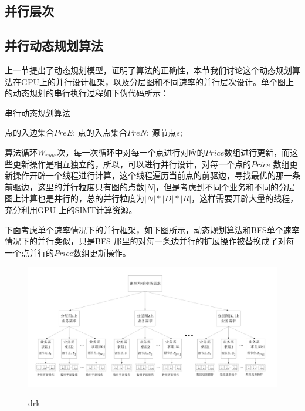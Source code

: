 \subsection{并行层次}
\subsection{并行动态规划算法}

上一节提出了动态规划模型，证明了算法的正确性，本节我们讨论这个动态规划算法在GPU上的并行设计框架，以及分层图和不同速率的并行层次设计。单个图上的动态规划的串行执行过程如下伪代码所示：
\begin{algorithm}[t]
\begin{algorithmic}[1]
\caption{{串行动态规划算法}}
\Require
	 点的入边集合$PreE$;
      点的入点集合$PreN$;
	 源节点$s$;
\EndFor
\EndFor
\end{algorithmic}
\end{algorithm}

算法循环$W_{max}$次，每一次循环中对每一个点进行对应的$Price$数组进行更新，而这些更新操作是相互独立的，所以，可以进行并行设计，对每一个点的$Price$ 数组更新操作开辟一个线程进行计算，这个线程遍历当前点的前驱边，寻找最优的那一条前驱边，这里的并行粒度只有图的点数$|N|$，但是考虑到不同个业务和不同的分层图上计算也是并行的，总的并行粒度为$|N|*|D|*|R|$，这样需要开辟大量的线程，充分利用GPU 上的SIMT计算资源。

下面考虑单个速率情况下的并行框架，如下图所示，动态规划算法和BFS单个速率情况下的并行类似，只是BFS 那里的对每一条边并行的扩展操作被替换成了对每一个点并行的$Price$数组更新操作。
 \begin{figure}
\setlength{\belowcaptionskip}{-0.5cm}
  \begin{center}
    {\includegraphics[width=1 \textwidth]{figures/DRK.pdf}}
    \end{center}
  \caption{{\footnotesize{drk}}}
  \label{drk}
\end{figure}

